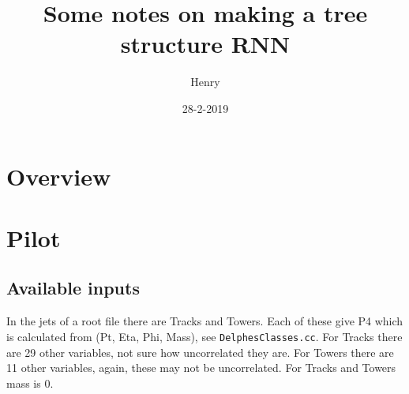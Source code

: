 \documentclass{article}
\title{Some notes on making a tree structure RNN}
\author{Henry}
\date{28-2-2019}
\begin{document}
\maketitle

\section{Overview}

\section{Pilot}
\subsection{Available inputs}
In the jets of a root file there are Tracks and Towers.
Each of these give P4 which is calculated from (Pt, Eta, Phi, Mass), see \lstinline{DelphesClasses.cc}.
For Tracks there are 29 other variables, not sure how uncorrelated they are.
For Towers there are 11 other variables, again, these may not be uncorrelated.
For Tracks and Towers mass is \(0\).
\end{document}
